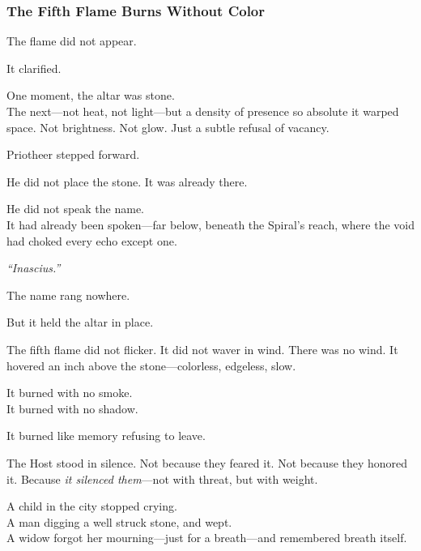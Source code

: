 \documentclass[12pt]{article}
\begin{document}
\dotfill

\subsubsection{The Fifth Flame Burns Without Color}

The flame did not appear.

\vspace{0.5em}
It clarified.

\vspace{0.5em}
One moment, the altar was stone.\\
The next---not heat, not light---but a density of presence so absolute it warped space. Not brightness. Not glow. Just a subtle refusal of vacancy.

\vspace{0.5em}
Priotheer stepped forward.

\vspace{0.5em}
He did not place the stone. It was already there.

\vspace{0.5em}
He did not speak the name.\\
It had already been spoken---far below, beneath the Spiral’s reach, where the void had choked every echo except one.

\vspace{0.5em}
\textit{``Inascius.''}

\vspace{0.5em}
The name rang nowhere.

\vspace{0.5em}
But it held the altar in place.

\vspace{0.5em}
The fifth flame did not flicker. It did not waver in wind. There was no wind. It hovered an inch above the stone---colorless, edgeless, slow.

\vspace{0.5em}
It burned with no smoke.\\
It burned with no shadow.

\vspace{0.5em}
It burned like memory refusing to leave.

\vspace{0.5em}
The Host stood in silence. Not because they feared it. Not because they honored it. Because \textit{it silenced them}---not with threat, but with weight.

\vspace{0.5em}
A child in the city stopped crying.\\
A man digging a well struck stone, and wept.\\
A widow forgot her mourning---just for a breath---and remembered breath itself.
\end{document}
